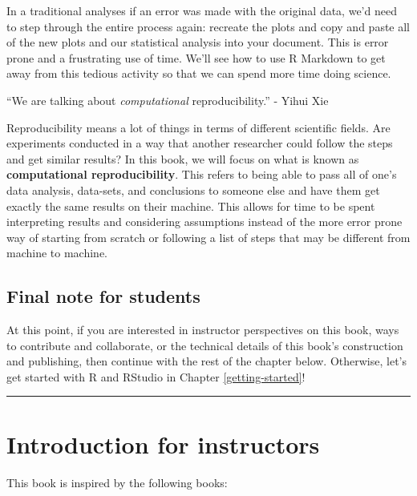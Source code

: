 \documentclass[12pt, krantz2,]{krantz}
\renewenvironment{quote}{\begin{VF}}{\end{VF}}
\begin{document}
In a traditional analyses if an error was made with the original data, we'd need to step through the entire process again: recreate the plots and copy and paste all of the new plots and our statistical analysis into your document. This is error prone and a frustrating use of time. We'll see how to use R Markdown to get away from this tedious activity so that we can spend more time doing science.

\begin{quote}
``We are talking about \emph{computational} reproducibility.'' - Yihui Xie
\end{quote}

Reproducibility means a lot of things in terms of different scientific fields. Are experiments conducted in a way that another researcher could follow the steps and get similar results? In this book, we will focus on what is known as \textbf{computational reproducibility}. This refers to being able to pass all of one's data analysis, data-sets, and conclusions to someone else and have them get exactly the same results on their machine. This allows for time to be spent interpreting results and considering assumptions instead of the more error prone way of starting from scratch or following a list of steps that may be different from machine to machine.

\hypertarget{final-note-for-students}{%
\subsection{Final note for students}\label{final-note-for-students}}

At this point, if you are interested in instructor perspectives on this book, ways to contribute and collaborate, or the technical details of this book's construction and publishing, then continue with the rest of the chapter below. Otherwise, let's get started with R and RStudio in Chapter \ref{getting-started}!

\begin{center}\rule{0.5\linewidth}{\linethickness}\end{center}

\hypertarget{sec:intro-instructors}{%
\section{Introduction for instructors}\label{sec:intro-instructors}}

This book is inspired by the following books:
\end{document}
